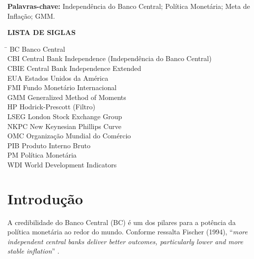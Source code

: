\documentclass[a4paper,12pt]{article}
\begin{document}
\vspace{1em}

\noindent
\textbf{Palavras-chave:} Independência do Banco Central; Política Monetária; Meta de Inflação; GMM.


\newpage
\tableofcontents
\thispagestyle{empty}

\newpage
\begin{center}
    \textbf{LISTA DE SIGLAS}
\end{center}
\begin{tabbing}
    \hspace{4cm} \= \kill 
    BC \> Banco Central \\
    CBI \> Central Bank Independence (Independência do Banco Central) \\
    CBIE \> Central Bank Independence Extended \\
    EUA \> Estados Unidos da América \\
    FMI \> Fundo Monetário Internacional \\
    GMM \> Generalized Method of Moments \\
    HP \> Hodrick-Prescott (Filtro) \\
    LSEG \> London Stock Exchange Group \\
    NKPC \> New Keynesian Phillips Curve \\
    OMC \> Organização Mundial do Comércio \\
    PIB \> Produto Interno Bruto \\
    PM \> Política Monetária \\
    WDI \> World Development Indicators \\
\end{tabbing}


\newpage
\listoffigures
\thispagestyle{empty}

\newpage
\listoftables
\thispagestyle{empty}

\newpage
\setcounter{page}{1}
\justify
\onehalfspacing

\section*{\textbf{Introdução}}

A credibilidade do Banco Central (BC) é um dos pilares para a potência da política monetária ao redor do mundo. Conforme ressalta Fischer (1994), “\emph{more independent central banks deliver better outcomes, particularly lower and more stable inflation}” \cite{fischer1994}.
\end{document}

